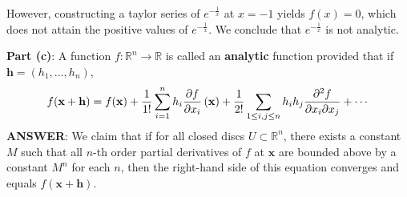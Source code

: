 \documentclass[11pt]{article}
\renewcommand{\vec}[1]{\mathbf{#1}}
\begin{document}
However, constructing a taylor series of $e^{-\tfrac{1}{x}}$ at $x = -1$ yields $f(x) = 0$, which does not attain the positive values of $e^{-\tfrac{1}{x}}$. We conclude that $e^{-\tfrac{1}{x}}$ is not analytic.

\textbf{Part (c)}: A function $f : \mathbb{R}^{n} \to \mathbb{R}$ is called an \textbf{analytic} function provided that if $\vec{h} = (h_{1}, \ldots, h_{n})$,
\[
	f(\vec{x} + \vec{h}) = f(\vec{x}) + \frac{1}{1!} \sum_{i = 1}^{n}h_{i} \pdv{f}{x_{i}} \left( \vec{x} \right) + \frac{1}{2!} \sum_{1 \le i, j \le n} h_{i}h_{j} \pdv[2]{f}{x_{i}}{x_{j}} (\vec{x}) + \cdots
\]
\textbf{ANSWER}: We claim that if for all closed discs $U \subset \mathbb{R}^{n}$, there exists a constant $M$ such that all $n$-th order partial derivatives of $f$ at $\vec{x}$ are bounded above by a constant $M^{n}$ for each $n$, then the right-hand side of this equation converges and equals $f(\vec{x} + \vec{h})$.
\end{document}
